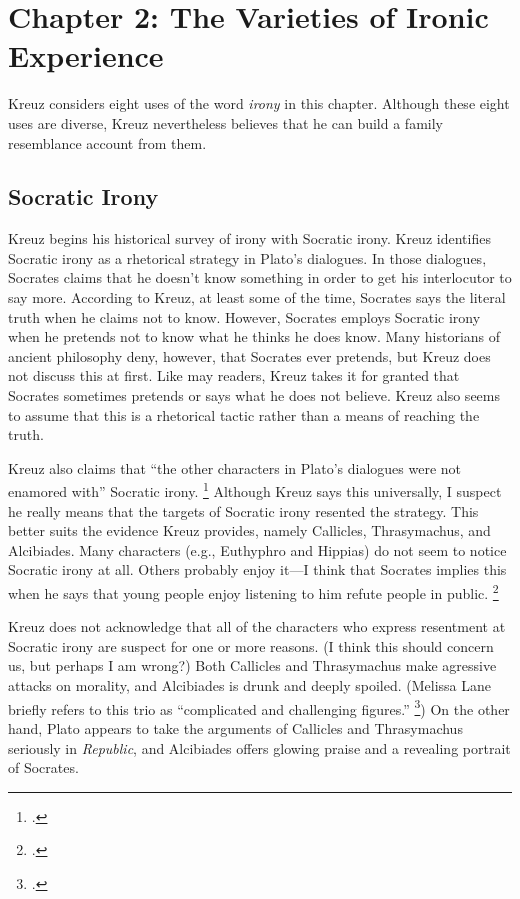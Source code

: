 \documentclass[12pt,letterpaper]{article}
\begin{document}

\section*{Chapter 2: The Varieties of Ironic Experience}

Kreuz considers eight uses of the word \textit{irony} in this chapter.
Although these eight uses are diverse, Kreuz nevertheless believes that he can build a family resemblance account from them.

\subsection*{Socratic Irony}

Kreuz begins his historical survey of irony with Socratic irony.
Kreuz identifies Socratic irony as a rhetorical strategy in Plato's dialogues.
In those dialogues, Socrates claims that he doesn't know something in order to get his interlocutor to say more.
According to Kreuz, at least some of the time, Socrates says the literal truth when he claims not to know.
However, Socrates employs Socratic irony when he pretends not to know what he thinks he does know.
Many historians of ancient philosophy deny, however, that Socrates ever pretends, but Kreuz does not discuss this at first.
Like may readers, Kreuz takes it for granted that Socrates sometimes pretends or says what he does not believe.
Kreuz also seems to assume that this is a rhetorical tactic rather than a means of reaching the truth.

Kreuz also claims that ``the other characters in Plato's dialogues were not enamored with'' Socratic irony.%
\footcite[][15]{kreuz-irony-and-sarcasm-2020}
Although Kreuz says this universally, I suspect he really means that the targets of Socratic irony resented the strategy.
This better suits the evidence Kreuz provides, namely Callicles, Thrasymachus, and Alcibiades.
Many characters (e.g., Euthyphro and Hippias) do not seem to notice Socratic irony at all.
Others probably enjoy it---I think that Socrates implies this when he says that young people enjoy listening to him refute people in public.%
\footcite[][34]{worlfsdorf-eironeia-aristophanes-plato-2008}

Kreuz does not acknowledge that all of the characters who express resentment at Socratic irony are suspect for one or more reasons.
(I think this should concern us, but perhaps I am wrong?)
Both Callicles and Thrasymachus make agressive attacks on morality, and Alcibiades is drunk and deeply spoiled.
(Melissa Lane briefly refers to this trio as ``complicated and challenging figures.''%
\footcite[][237]{lane-reconsidering-socratic-irony-2011})
On the other hand, Plato appears to take the arguments of Callicles and Thrasymachus seriously in \textit{Republic}, and Alcibiades offers glowing praise and a revealing portrait of Socrates.
\end{document}
